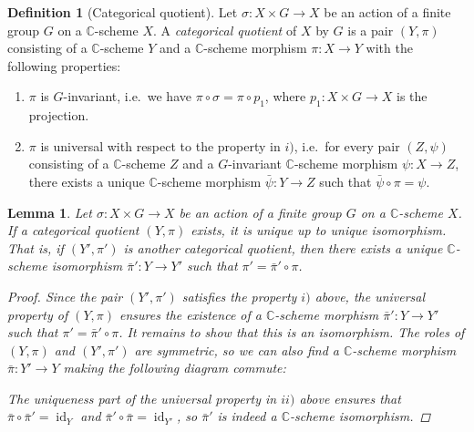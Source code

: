\documentclass[12pt,a4paper]{amsart}
\theoremstyle{plain}
\newtheorem{lm}[thm]{Lemma}
\theoremstyle{definition}
\newtheorem{defn}[thm]{Definition}
\theoremstyle{remark}
\begin{document}
\begin{defn}[Categorical quotient]
  Let $\sigma \colon X \times G \to X$ be an action of a finite group $G$ on a $\mathbb{C}$-scheme $X$.
  A \textit{categorical quotient} of $X$ by $G$ is a pair $(Y,\pi)$ consisting of a $\mathbb{C}$-scheme $Y$ and a $\mathbb{C}$-scheme morphism $\pi \colon X \to Y$ with the following properties:
  \begin{enumerate}[label=\roman*)]
    \item $\pi$ is $G$-invariant, i.e.~we have $\pi \circ \sigma = \pi \circ p_{1}$, where $p_{1} \colon X \times G \to X$ is the projection.
    \item $\pi$ is universal with respect to the property in $i)$, i.e.~for every pair $(Z,\psi)$ consisting of a $\mathbb{C}$-scheme $Z$ and a $G$-invariant $\mathbb{C}$-scheme morphism $\psi \colon X \to Z$, there exists a unique $\mathbb{C}$-scheme morphism $\bar{\psi} \colon Y \to Z$ such that $\bar{\psi} \circ \pi = \psi$.
  \end{enumerate}
\end{defn}

\begin{lm}\label{lm:uniquequotient}
  Let $\sigma \colon X \times G \to X$ be an action of a finite group $G$ on a $\mathbb{C}$-scheme $X$.
  If a categorical quotient $(Y,\pi)$ exists, it is unique up to unique isomorphism.
  That is, if $(Y', \pi')$ is another categorical quotient, then there exists a unique $\mathbb{C}$-scheme isomorphism $\bar{\pi}' \colon Y \to Y'$ such that $\pi' = \bar{\pi}' \circ \pi$.
  
  \begin{proof}
    Since the pair $(Y', \pi')$ satisfies the property $i)$ above, the universal property of $(Y, \pi)$ ensures the existence of a $\mathbb{C}$-scheme morphism $\bar{\pi}' \colon Y \to Y'$ such that $\pi' = \bar{\pi}' \circ \pi$.
    It remains to show that this is an isomorphism.
    The roles of $(Y, \pi)$ and $(Y', \pi')$ are symmetric, so we can also find a $\mathbb{C}$-scheme morphism $\bar{\pi} \colon Y' \to Y$ making the following diagram commute:

    \begin{center}
    \end{center}

    The uniqueness part of the universal property in $ii)$ above ensures that $\bar{\pi} \circ \bar{\pi}' = \operatorname{id}_{Y}$ and $\bar{\pi}' \circ \bar{\pi} = \operatorname{id}_{Y'}$, so $\bar{\pi}'$ is indeed a $\mathbb{C}$-scheme isomorphism.

  \end{proof}
\end{lm}
\end{document}
